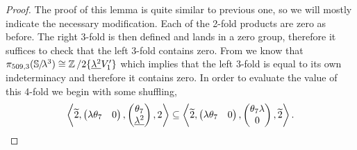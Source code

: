 \begin{proof}
  The proof of this lemma is quite similar to previous one, so we will mostly indicate the necessary modification. Each of the 2-fold products are zero as before. 
  The right 3-fold is then defined and lands in a zero group, therefore it suffices to check that the left 3-fold contains zero.
  From  we know that $\pi_{509,3}(\operatorname{\mathbb{S}}\hspace{-2.2pt}/\!\lambda^3) \cong \operatorname{\mathbb{Z}}/2\{ \underline{\lambda^2} V_1'  \}$ which implies that the left 3-fold is equal to its own indeterminacy and therefore it contains zero.
  In order to evaluate the value of this 4-fold we begin with some shuffling,
  \[ \left\langle \wt{2}, \begin{pmatrix} \lambda \theta_7 & 0 \end{pmatrix}, \begin{pmatrix} \theta_7 \\ \underline{\lambda^2} \end{pmatrix}, 2 \right\rangle \subseteq \left\langle \wt{2}, \begin{pmatrix} \lambda \theta_7 & 0 \end{pmatrix}, \begin{pmatrix} \theta_7\lambda \\ 0 \end{pmatrix}, \wt{2} \right\rangle. \]
  

\end{proof}
